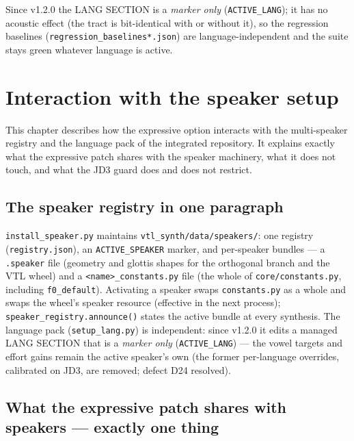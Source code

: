 \documentclass[11pt,a4paper]{article}
\begin{document}
\begin{warning}
Since v1.2.0 the LANG SECTION is a \emph{marker only}
(\texttt{ACTIVE\_LANG}); it has no acoustic effect (the tract is
bit-identical with or without it), so the regression baselines
(\texttt{regression\_baselines*.json}) are language-independent
and the suite stays green whatever language is active.
\end{warning}

\section{Interaction with the speaker setup}\label{sec:speakers}

This chapter describes how the expressive option interacts with the
multi-speaker registry and the language pack of the integrated
repository. It explains exactly what the
expressive patch shares with the speaker machinery, what it does
not touch, and what the JD3 guard does and does not restrict.

\subsection{The speaker registry in one paragraph}

\texttt{install\_speaker.py} maintains
\texttt{vtl\_synth/data/speakers/}: one registry
(\texttt{registry.json}), an \texttt{ACTIVE\_SPEAKER} marker, and
per-speaker bundles --- a \texttt{.speaker} file (geometry and
glottis shapes for the orthogonal branch and the VTL wheel) and a
\texttt{<name>\_constants.py} file (the whole of
\texttt{core/constants.py}, including \texttt{f0\_default}).
Activating a speaker swaps \texttt{constants.py} as a whole and
swaps the wheel's speaker resource (effective in the next
process); \texttt{speaker\_registry.announce()} states the active
bundle at every synthesis. The language pack
(\texttt{setup\_lang.py}) is independent: since v1.2.0 it edits a managed LANG
SECTION that is a \emph{marker only} (\texttt{ACTIVE\_LANG})
--- the vowel targets and effort gains remain the active
speaker's own (the former per-language overrides, calibrated
on JD3, are removed; defect D24 resolved).

\subsection{What the expressive patch shares with speakers ---
  exactly one thing}
\end{document}
